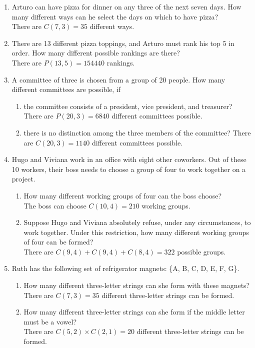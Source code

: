 \documentclass[10pt]{article}
\begin{document}
\begin{enumerate}
  \item Arturo can have pizza for dinner on any three of the next seven days. How many different ways can he select the days on which to have pizza?\\
  There are $C(7,3) = 35$ different ways.
  \item There are 13 different pizza toppings, and Arturo must rank his top 5 in order. How many different possible rankings are there?\\
  There are $P(13,5) = 154440$ rankings.
  \item A committee of three is chosen from a group of 20 people. How many different committees are possible, if
  \begin{enumerate}
    \item the committee consists of a president, vice president, and treasurer?
    There are $P(20,3) = 6840$ different committees possible.
    \item there is no distinction among the three members of the committee?
    There are $C(20,3) = 1140$ different committees possible.
  \end{enumerate}

  \item Hugo and Viviana work in an office with eight other coworkers. Out of these 10 workers, their boss needs to choose a group of four to work together on a project.
  \begin{enumerate}
    \item How many different working groups of four can the boss choose?\\
    The boss can choose $C(10,4) = 210$ working groups.
    \item Suppose Hugo and Viviana absolutely refuse, under any circumstances, to work together. Under this restriction, how many different working groups of four can be formed?\\
    There are $C(9,4) + C(9,4) + C(8,4) = 322$ possible groups.
  \end{enumerate}

  \item Ruth has the following set of refrigerator magnets: \{A, B, C, D, E, F, G\}.
  \begin{enumerate}
    \item How many different three-letter strings can she form with these magnets?\\
    There are $C(7,3) = 35$ different three-letter strings can be formed.
    \item How many different three-letter strings can she form if the middle letter must be a vowel?\\
    There are $C(5,2) \times C(2,1) = 20$ different three-letter strings can be formed.
  \end{enumerate}


\end{enumerate}
\end{document}
